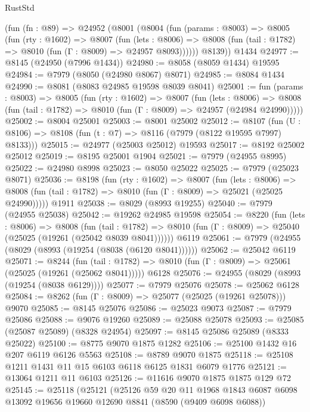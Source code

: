 \begin{lexlean}{RustStd}
\begin{coremodule}
    (fun (fn : @89) =>
    @24952
      (@8001
        (@8004
          (fun (params : @8003) =>
          @8005
            (fun (rty : @1602) =>
            @8007
              (fun (lets : @8006) =>
              @8008 (fun (tail : @1782) => @8010 (fun (Γ : @8009) => @24957 @8093))))))
        @8139))
    @1434
@24977 := @8145 (@24950 (@7996 @1434))
@24980 := @8058 (@8059 @1434) @19595
@24984 := @7979 (@8050 (@24980 @8067) @8071)
@24985 := @8084 @1434
@24990 := @8081 (@8083 @24985 @19598 @8039 @8041)
@25001 := fun (params : @8003) =>
  @8005
    (fun (rty : @1602) =>
    @8007
      (fun (lets : @8006) =>
      @8008 (fun (tail : @1782) => @8010 (fun (Γ : @8009) => @24957 (@24984 @24990)))))
@25002 := @8004 @25001
@25003 := @8001 @25002
@25012 := @8107
    (fun (U : @8106) => @8108 (fun (t : @7) => @8116 (@7979 (@8122 @19595 @7997) @8133)))
@25015 := @24977 (@25003 @25012) @19593
@25017 := @8192 @25002 @25012
@25019 := @8195 @25001 @1904
@25021 := @7979 (@24955 @8995)
@25022 := @24980 @8998
@25023 := @8050 @25022
@25025 := @7979 (@25023 @8071)
@25036 := @8198
    (fun (rty : @1602) =>
    @8007
      (fun (lets : @8006) =>
      @8008 (fun (tail : @1782) => @8010 (fun (Γ : @8009) => @25021 (@25025 @24990)))))
    @1911
@25038 := @8029 (@8993 @19255)
@25040 := @7979 (@24955 @25038)
@25042 := @19262 @24985 @19598
@25054 := @8220
    (fun (lets : @8006) =>
    @8008
      (fun (tail : @1782) =>
      @8010 (fun (Γ : @8009) => @25040 (@25025 (@19261 (@25042 @8039 @8041))))))
    @6119
@25061 := @7979 (@24955 (@8029 (@8993 (@19254 (@8038 (@6120 @8041))))))
@25062 := @25042 @6119
@25071 := @8244
    (fun (tail : @1782) => @8010 (fun (Γ : @8009) => @25061 (@25025 (@19261 (@25062 @8041)))))
    @6128
@25076 := @24955 (@8029 (@8993 (@19254 (@8038 @6129))))
@25077 := @7979 @25076
@25078 := @25062 @6128
@25084 := @8262 (fun (Γ : @8009) => @25077 (@25025 (@19261 @25078))) @9070
@25085 := @8145 @25076
@25086 := @25023 @9073
@25087 := @7979 @25086
@25088 := @9076 @19260
@25089 := @25088 @25078
@25093 := @25085 (@25087 @25089) (@8328 @24954)
@25097 := @8145 @25086 @25089 (@8333 @25022)
@25100 := @8775 @9070 @1875 @1282
@25106 := @25100 @1432 @16 @207 @6119 @6126 @5563
@25108 := @8789 @9070 @1875
@25118 := @25108 @1211 @1431 @11 @15 @6103 @6118 @6125 @1831 @6079 @1776
@25121 := @13064 @1211 @11 @6103
@25126 := @11616 @9070 @1875 @1875 @129 @72
@25145 := @25118
    (@25121
      (@25126
        @59
        @20
        @11
        @1968
        @1843
        @6087
        @6098
        @13092
        @19656
        @19660
        @12690
        @8841
        (@8590 (@9409 @6098 @6088))

\end{coremodule}
\end{lexlean}
